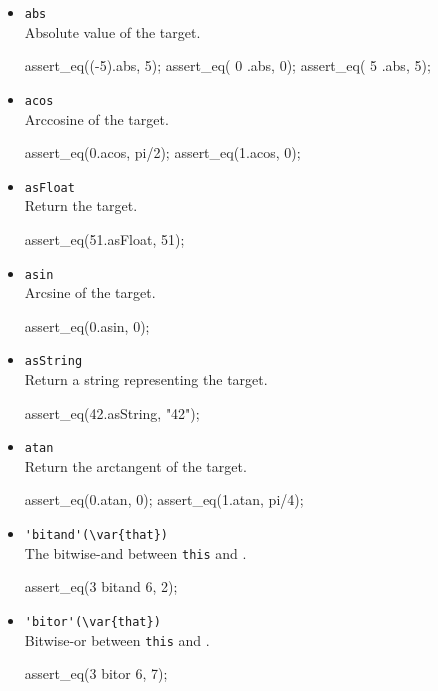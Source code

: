 \begin{itemize}
\item \lstinline|abs|\\
  Absolute value of the target.
\begin{urbiscript}[firstnumber=last]
assert_eq((-5).abs, 5);
assert_eq(  0 .abs, 0);
assert_eq(  5 .abs, 5);
\end{urbiscript}

\item \lstinline|acos|\\
  Arccosine of the target.
\begin{urbiscript}[firstnumber=last]
assert_eq(0.acos, pi/2);
assert_eq(1.acos, 0);
\end{urbiscript}

\item \lstinline|asFloat|\\
  Return the target.
\begin{urbiscript}[firstnumber=last]
assert_eq(51.asFloat, 51);
\end{urbiscript}

\item \lstinline|asin|\\
  Arcsine of the target.
\begin{urbiscript}[firstnumber=last]
assert_eq(0.asin, 0);
\end{urbiscript}

\item \lstinline|asString|\\
  Return a string representing the target.
\begin{urbiscript}[firstnumber=last]
assert_eq(42.asString, "42");
\end{urbiscript}

\item \lstinline|atan|\\
  Return the arctangent of the target.
\begin{urbiscript}[firstnumber=last]
assert_eq(0.atan, 0);
assert_eq(1.atan, pi/4);
\end{urbiscript}

\item \lstinline|'bitand'(\var{that})|\\
  The bitwise-and between \lstinline|this| and .
\begin{urbiscript}[firstnumber=last]
assert_eq(3 bitand 6, 2);
\end{urbiscript}

\item \lstinline|'bitor'(\var{that})|\\
  Bitwise-or between \lstinline|this| and .
\begin{urbiscript}[firstnumber=last]
assert_eq(3 bitor 6, 7);
\end{urbiscript}


\end{itemize}
